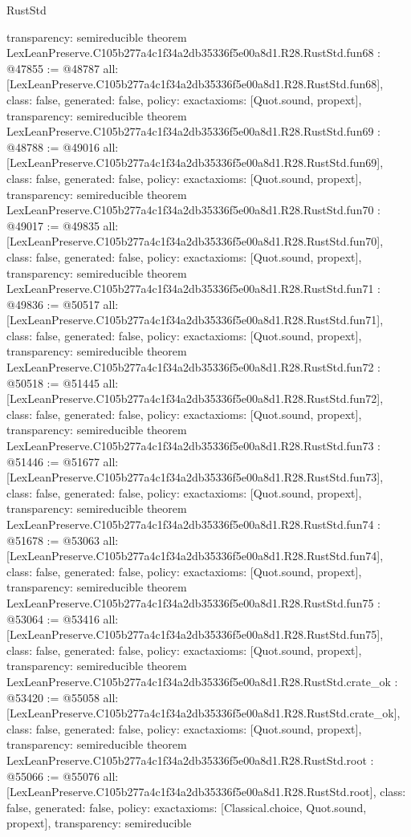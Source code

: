 \begin{lexlean}{RustStd}
\begin{coremodule}
{  transparency: semireducible
}
theorem LexLeanPreserve.C105b277a4c1f34a2db35336f5e00a8d1.R28.RustStd.fun68 : @47855 := @48787 {
  all: [LexLeanPreserve.C105b277a4c1f34a2db35336f5e00a8d1.R28.RustStd.fun68],
  class: false,
  generated: false,
  policy: exact{axioms: [Quot.sound, propext]},
  transparency: semireducible
}
theorem LexLeanPreserve.C105b277a4c1f34a2db35336f5e00a8d1.R28.RustStd.fun69 : @48788 := @49016 {
  all: [LexLeanPreserve.C105b277a4c1f34a2db35336f5e00a8d1.R28.RustStd.fun69],
  class: false,
  generated: false,
  policy: exact{axioms: [Quot.sound, propext]},
  transparency: semireducible
}
theorem LexLeanPreserve.C105b277a4c1f34a2db35336f5e00a8d1.R28.RustStd.fun70 : @49017 := @49835 {
  all: [LexLeanPreserve.C105b277a4c1f34a2db35336f5e00a8d1.R28.RustStd.fun70],
  class: false,
  generated: false,
  policy: exact{axioms: [Quot.sound, propext]},
  transparency: semireducible
}
theorem LexLeanPreserve.C105b277a4c1f34a2db35336f5e00a8d1.R28.RustStd.fun71 : @49836 := @50517 {
  all: [LexLeanPreserve.C105b277a4c1f34a2db35336f5e00a8d1.R28.RustStd.fun71],
  class: false,
  generated: false,
  policy: exact{axioms: [Quot.sound, propext]},
  transparency: semireducible
}
theorem LexLeanPreserve.C105b277a4c1f34a2db35336f5e00a8d1.R28.RustStd.fun72 : @50518 := @51445 {
  all: [LexLeanPreserve.C105b277a4c1f34a2db35336f5e00a8d1.R28.RustStd.fun72],
  class: false,
  generated: false,
  policy: exact{axioms: [Quot.sound, propext]},
  transparency: semireducible
}
theorem LexLeanPreserve.C105b277a4c1f34a2db35336f5e00a8d1.R28.RustStd.fun73 : @51446 := @51677 {
  all: [LexLeanPreserve.C105b277a4c1f34a2db35336f5e00a8d1.R28.RustStd.fun73],
  class: false,
  generated: false,
  policy: exact{axioms: [Quot.sound, propext]},
  transparency: semireducible
}
theorem LexLeanPreserve.C105b277a4c1f34a2db35336f5e00a8d1.R28.RustStd.fun74 : @51678 := @53063 {
  all: [LexLeanPreserve.C105b277a4c1f34a2db35336f5e00a8d1.R28.RustStd.fun74],
  class: false,
  generated: false,
  policy: exact{axioms: [Quot.sound, propext]},
  transparency: semireducible
}
theorem LexLeanPreserve.C105b277a4c1f34a2db35336f5e00a8d1.R28.RustStd.fun75 : @53064 := @53416 {
  all: [LexLeanPreserve.C105b277a4c1f34a2db35336f5e00a8d1.R28.RustStd.fun75],
  class: false,
  generated: false,
  policy: exact{axioms: [Quot.sound, propext]},
  transparency: semireducible
}
theorem LexLeanPreserve.C105b277a4c1f34a2db35336f5e00a8d1.R28.RustStd.crate_ok : @53420 := @55058 {
  all: [LexLeanPreserve.C105b277a4c1f34a2db35336f5e00a8d1.R28.RustStd.crate_ok],
  class: false,
  generated: false,
  policy: exact{axioms: [Quot.sound, propext]},
  transparency: semireducible
}
theorem LexLeanPreserve.C105b277a4c1f34a2db35336f5e00a8d1.R28.RustStd.root : @55066 := @55076 {
  all: [LexLeanPreserve.C105b277a4c1f34a2db35336f5e00a8d1.R28.RustStd.root],
  class: false,
  generated: false,
  policy: exact{axioms: [Classical.choice, Quot.sound, propext]},
  transparency: semireducible
}


\end{coremodule}
\end{lexlean}
